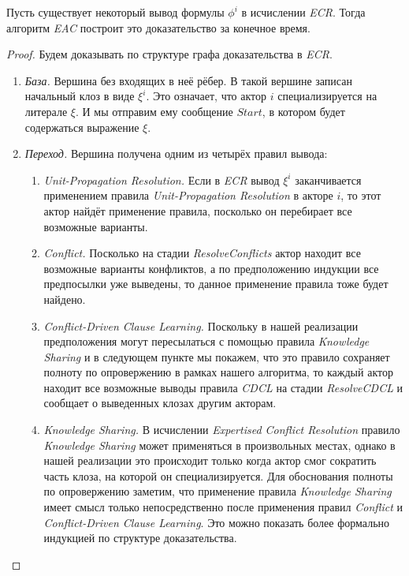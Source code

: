 \begin{theorem}
Пусть существует некоторый вывод формулы $\phi^i$ в исчислении \emph{ECR}. Тогда алгоритм \emph{EAC} построит это доказательство за конечное время.
\end{theorem}
\begin{proof}
Будем доказывать по структуре графа доказательства в \emph{ECR}.
\begin{enumerate}[label=$\star$]
	\item \emph{База.} Вершина без входящих в неё рёбер. В такой вершине записан начальный клоз в виде $\xi^i$. Это означает, что актор $i$ специализируется на литерале $\xi$. И мы отправим ему сообщение $Start$, в котором будет содержаться выражение $\xi$.
    \item \emph{Переход.} Вершина получена одним из четырёх правил вывода: 
    \begin{enumerate}
      \item \emph{Unit-Propagation Resolution.} Если в \emph{ECR} вывод $\xi^i$ заканчивается применением правила \emph{Unit-Propagation Resolution} в акторе $i$, то этот актор найдёт применение правила, посколько он перебирает все возможные варианты. 
      \item \emph{Conflict.} Посколько на стадии \emph{ResolveConflicts} актор находит все возможные варианты конфликтов, а по предположению индукции все предпосылки уже выведены, то данное применение правила тоже будет найдено.
      \item \emph{Conflict-Driven Clause Learning.} Поскольку в нашей реализации предположения могут пересылаться с помощью правила \emph{Knowledge Sharing} и в следующем пункте мы покажем, что это правило сохраняет полноту по опровержению в рамках нашего алгоритма, то каждый актор находит все возможные выводы правила \emph{CDCL} на стадии \emph{ResolveCDCL} и сообщает о выведенных клозах другим акторам.
      \item \emph{Knowledge Sharing.} В исчислении \emph{Expertised Conflict Resolution} правило \emph{Knowledge Sharing} может применяться в произвольных местах, однако в нашей реализации это происходит только когда актор смог сократить часть клоза, на которой он специализируется. Для обоснования полноты по опровержению заметим, что применение правила \emph{Knowledge Sharing} имеет смысл только непосредственно после применения правил \emph{Conflict} и \emph{Conflict-Driven Clause Learning}. Это можно показать более формально индукцией по структуре доказательства.
    \end{enumerate}
\end{enumerate}
\end{proof}

